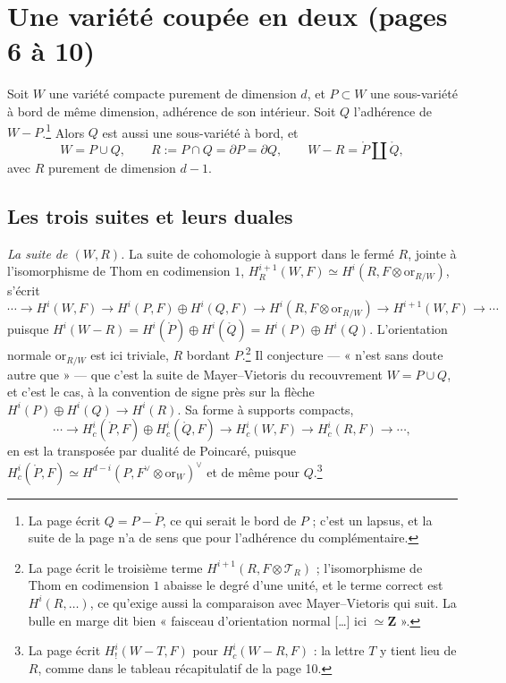 \documentclass[11pt,a4paper]{article}
\begin{document}
\section*{Une variété coupée en deux (pages 6 à 10)}

Soit $W$ une variété compacte purement de dimension $d$, et $P \subset W$ une
sous-variété à bord de même dimension, adhérence de son intérieur. Soit $Q$
l'adhérence de $W - P$.\footnote{La page écrit $Q = P - \mathring{P}$, ce qui
serait le bord de $P$ ; c'est un lapsus, et la suite de la page n'a de sens
que pour l'adhérence du complémentaire.} Alors $Q$ est aussi une sous-variété à
bord, et
\[
  W = P \cup Q, \qquad R := P \cap Q = \partial P = \partial Q, \qquad
  W - R = \mathring{P} \amalg \mathring{Q},
\]
avec $R$ purement de dimension $d-1$.

\subsection*{Les trois suites et leurs duales}

\emph{La suite de $(W, R)$.} La suite de cohomologie à support dans le fermé
$R$, jointe à l'isomorphisme de Thom en codimension $1$,
$H^{i+1}_{R}(W, F) \simeq H^{i}(R, F \otimes \mathrm{or}_{R/W})$, s'écrit
\[
  \cdots \to H^{i}(W, F) \to H^{i}(P, F) \oplus H^{i}(Q, F)
  \to H^{i}(R, F \otimes \mathrm{or}_{R/W}) \to H^{i+1}(W, F) \to \cdots
\]
puisque $H^{i}(W - R) = H^{i}(\mathring{P}) \oplus H^{i}(\mathring{Q}) =
H^{i}(P) \oplus H^{i}(Q)$. L'orientation normale $\mathrm{or}_{R/W}$ est ici
triviale, $R$ bordant $P$.\footnote{La page écrit le troisième terme
$H^{i+1}(R, F \otimes \mathcal{T}_{R})$ ; l'isomorphisme de Thom en
codimension $1$ abaisse le degré d'une unité, et le terme correct est
$H^{i}(R, \ldots)$, ce qu'exige aussi la comparaison avec Mayer--Vietoris qui
suit. La bulle en marge dit bien « faisceau d'orientation normal […] ici
$\simeq \mathbf{Z}$ ».} Il conjecture — « n'est sans doute autre que » — que
c'est la suite de Mayer--Vietoris du recouvrement $W = P \cup Q$, et c'est le
cas, à la convention de signe près sur la flèche
$H^{i}(P) \oplus H^{i}(Q) \to H^{i}(R)$. Sa forme à supports compacts,
\[
  \cdots \to H^{i}_{c}(\mathring{P}, F) \oplus H^{i}_{c}(\mathring{Q}, F)
  \to H^{i}_{c}(W, F) \to H^{i}_{c}(R, F) \to \cdots,
\]
en est la transposée par dualité de Poincaré, puisque
$H^{i}_{c}(\mathring{P}, F) \simeq H^{d-i}(P, F^{\vee} \otimes
\mathrm{or}_{W})^{\vee}$ et de même pour $Q$.\footnote{La page écrit
$H^{i}_{!}(W - T, F)$ pour $H^{i}_{c}(W - R, F)$ : la lettre $T$ y tient lieu
de $R$, comme dans le tableau récapitulatif de la page 10.}
\end{document}
